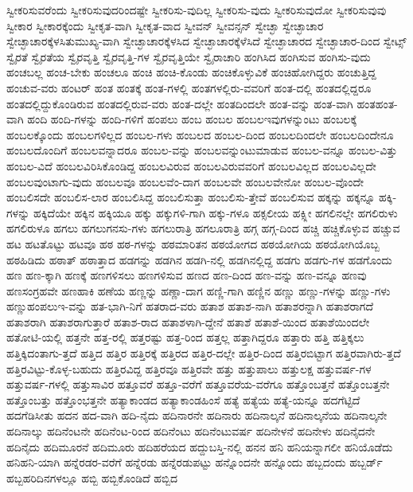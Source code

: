 {ಸ್ವೀಕರಿಸುವರೆಂದು
ಸ್ವೀಕರಿಸುವುದರಿಂದಷ್ಟೇ
ಸ್ವೀಕರಿಸು-ವುದಿಲ್ಲ
ಸ್ವೀಕರಿಸು-ವುದು
ಸ್ವೀಕರಿಸುವುದೋ
ಸ್ವೀಕರಿಸುವುವು
ಸ್ವೀಕಾರ
ಸ್ವೀಕಾರಕ್ಕೆಂದು
ಸ್ವೀಕೃತ-ವಾಗಿ
ಸ್ವೀಕೃತ-ವಾದ
ಸ್ವೀವನ್
ಸ್ವೀವನ್ಸನ್
ಸ್ವೇಚ್ಛಾ
ಸ್ವೇಚ್ಛಾಚಾರ
ಸ್ವೇಚ್ಛಾಚಾರಕ್ಕೆಳಸಿತುಮುಖ್ಯ-ವಾಗಿ
ಸ್ವೇಚ್ಛಾಚಾರಕ್ಕೆಳಸಿದ
ಸ್ವೇಚ್ಛಾಚಾರಕ್ಕೆಳೆಸಿದೆ
ಸ್ವೇಚ್ಛಾಚಾರದ
ಸ್ವೇಚ್ಛಾಚಾರ-ದಿಂದ
ಸ್ವೇಟ್ಸ್
ಸ್ವೈರತೆ
ಸ್ವೈರತೆಯ
ಸ್ವೈರವೃತ್ತಿ
ಸ್ವೈರವೃತ್ತಿ-ಗಳ
ಸ್ವೈರವೃತ್ತಿಯೇ
ಸ್ವೈರಾಚಾರಿ
ಹಂಗಿಸಿದ
ಹಂಗಿಸುವ
ಹಂಗಿಸು-ವುದು
ಹಂಚಬಲ್ಲ
ಹಂಚ-ಬೇಕು
ಹಂಚಲೂ
ಹಂಚಿ
ಹಂಚಿ-ಕೊಂಡು
ಹಂಚಿಕೊಳ್ಳುವಿಕೆ
ಹಂಚಿಹೋಗಿದ್ದರು
ಹಂಚುತ್ತಿದ್ದ
ಹಂಚುವ-ವರು
ಹಂಟರ್
ಹಂತ
ಹಂತಕ್ಕೆ
ಹಂತ-ಗಳಲ್ಲಿ
ಹಂತಗಳಲ್ಲಿರು-ವವರಿಗೆ
ಹಂತ-ದಲ್ಲಿ
ಹಂತದಲ್ಲಿದ್ದರೂ
ಹಂತದಲ್ಲಿದ್ದುಕೊಂಡಿರುವ
ಹಂತದಲ್ಲಿರುವ-ವರು
ಹಂತ-ದಲ್ಲೇ
ಹಂತದಿಂದಲೇ
ಹಂತ-ವನ್ನು
ಹಂತ-ವಾಗಿ
ಹಂತಹಂತ-ವಾಗಿ
ಹಂದಿ
ಹಂದಿ-ಗಳನ್ನು
ಹಂದಿ-ಗಳಿಗೆ
ಹಂಪಲು
ಹಂಬ
ಹಂಬಲ
ಹಂಬಲಇವುಗಳನ್ನುಂಟು
ಹಂಬಲಕ್ಕೆ
ಹಂಬಲಕ್ಕೊಂದು
ಹಂಬಲಗಳಿಲ್ಲದ
ಹಂಬಲ-ಗಳು
ಹಂಬಲದ
ಹಂಬಲ-ದಿಂದ
ಹಂಬಲದಿಂದಲೇ
ಹಂಬಲದಿಂದೇನೂ
ಹಂಬಲದೊಂದಿಗೆ
ಹಂಬಲವನ್ನಾದರೂ
ಹಂಬಲ-ವನ್ನು
ಹಂಬಲವನ್ನುಂಟುಮಾಡುವ
ಹಂಬಲ-ವನ್ನೂ
ಹಂಬಲ-ವಿತ್ತು
ಹಂಬಲ-ವಿದೆ
ಹಂಬಲವಿರಿಸಿಕೊಂಡಿದ್ದ
ಹಂಬಲವಿರುವ
ಹಂಬಲವಿರುವವರಿಗೆ
ಹಂಬಲವಿಲ್ಲದ
ಹಂಬಲವಿಲ್ಲದೇ
ಹಂಬಲವುಂಟಾಗು-ವುದು
ಹಂಬಲವೂ
ಹಂಬಲವೆಂ-ದಾಗ
ಹಂಬಲವೇ
ಹಂಬಲವೇನೋ
ಹಂಬಲ-ವೊಂದೇ
ಹಂಬಲಿಸದೇ
ಹಂಬಲಿಸ-ಲಾರ
ಹಂಬಲಿಸಿದ್ದ
ಹಂಬಲಿಸುತ್ತಾ
ಹಂಬಲಿಸು-ತ್ತೇವೆ
ಹಂಬಲಿಸುವ
ಹಕ್ಕನ್ನು
ಹಕ್ಕನ್ನೂ
ಹಕ್ಕಿ-ಗಳನ್ನು
ಹಕ್ಕಿದೆಯೇ
ಹಕ್ಕಿನ
ಹಕ್ಕಿಯೂ
ಹಕ್ಕು
ಹಕ್ಕುಗಳಿ-ಗಾಗಿ
ಹಕ್ಕು-ಗಳೂ
ಹಕ್ಸಲೀಯ
ಹಕ್ಸ್ಲೀ
ಹಗಲಿನಲ್ಲೇ
ಹಗಲಿರುಳು
ಹಗಲಿರುಳೂ
ಹಗಲು
ಹಗಲುಗನಸು-ಗಳು
ಹಗಲುರಾತ್ರಿ
ಹಗಲೂರಾತ್ರಿ
ಹಗ್ಗ
ಹಗ್ಗ-ದಿಂದ
ಹಚ್ಚಿ
ಹಚ್ಚಿಕೊಳ್ಳುವ
ಹಚ್ಚುವ
ಹಟ
ಹಟತೊಟ್ಟು
ಹಟವೂ
ಹಠ
ಹಠ-ಗಳನ್ನು
ಹಠಮಾರಿತನ
ಹಠಯೋಗದ
ಹಠಯೋಗಿಯ
ಹಠಯೋಗಿಯೊಬ್ಬ
ಹಠಹಿಡಿದು
ಹಠಾತ್
ಹಠಾತ್ತಾದ
ಹಡಗನ್ನು
ಹಡಗಿನ
ಹಡಗಿ-ನಲ್ಲಿ
ಹಡಗಿನಲ್ಲಿದ್ದ
ಹಡಗು
ಹಡಗು-ಗಳ
ಹಡಗೊಂದು
ಹಣ
ಹಣ-ಕ್ಕಾಗಿ
ಹಣಕ್ಕೆ
ಹಣಗಳಿಸಲು
ಹಣಗಳಿಸುವ
ಹಣದ
ಹಣ-ದಿಂದ
ಹಣ-ವನ್ನು
ಹಣ-ವನ್ನೂ
ಹಣವು
ಹಣಸಂಗ್ರಹವೇ
ಹಣಹಾಕಿ
ಹಣೆಯ
ಹಣ್ಣನ್ನು
ಹಣ್ಣಾ-ದಾಗ
ಹಣ್ಣಿ-ಗಾಗಿ
ಹಣ್ಣಿನ
ಹಣ್ಣು
ಹಣ್ಣು-ಗಳನ್ನು
ಹಣ್ಣು-ಗಳು
ಹಣ್ಣುಹಂಪಲುಇ-ವನ್ನು
ಹತ-ಭಾಗಿ-ನಿಗೆ
ಹತರಾದ-ವರು
ಹತಾಶ
ಹತಾಶ-ನಾಗಿ
ಹತಾಶರನ್ನಾಗಿ
ಹತಾಶರಾಗದೆ
ಹತಾಶರಾಗಿ
ಹತಾಶರಾಗುತ್ತಾರೆ
ಹತಾಶ-ರಾದ
ಹತಾಶಳಾಗಿ-ದ್ದೇನೆ
ಹತಾಶೆ
ಹತಾಶೆ-ಯಿಂದ
ಹತಾಶೆಯಿಂದಲೇ
ಹತೋಟಿ-ಯಲ್ಲಿ
ಹತ್ತನೇ
ಹತ್ತ-ರಲ್ಲಿ
ಹತ್ತರಷ್ಟು
ಹತ್ತ-ರಿಂದ
ಹತ್ತಲ್ಲ
ಹತ್ತಾಗಿದ್ದರೂ
ಹತ್ತಾರು
ಹತ್ತಿ
ಹತ್ತಿಕ್ಕಲು
ಹತ್ತಿಕ್ಕಿದಂತಾಗು-ತ್ತದೆ
ಹತ್ತಿದ
ಹತ್ತಿರ
ಹತ್ತಿರಕ್ಕೆ
ಹತ್ತಿರದ
ಹತ್ತಿರ-ದಲ್ಲೇ
ಹತ್ತಿರ-ದಿಂದ
ಹತ್ತಿರಬಿಟ್ಟಾಗ
ಹತ್ತಿರವಾಗಿರು-ತ್ತದೆ
ಹತ್ತಿರವಿಟ್ಟು-ಕೊಳ್ಳ-ಬಹುದು
ಹತ್ತಿರವಿದ್ದ
ಹತ್ತಿರವೂ
ಹತ್ತಿರವೇ
ಹತ್ತು
ಹತ್ತುಪಾಲು
ಹತ್ತುಲಕ್ಷ
ಹತ್ತುವರ್ಷ-ಗಳ
ಹತ್ತುವರ್ಷ-ಗಳಲ್ಲಿ
ಹತ್ತುಸಾವಿರ
ಹತ್ತೂವರೆ
ಹತ್ತೂ-ವರೆಗೆ
ಹತ್ತೂವರೆಯ-ವರೆಗೂ
ಹತ್ತೊಂಬತ್ತನೆ
ಹತ್ತೊಂಬತ್ತನೇ
ಹತ್ತೊಂಬತ್ತು
ಹತ್ತೊಂಭತ್ತನೇ
ಹತ್ಯಾಕಾಂಡದ
ಹತ್ಯಾಕಾಂಡಹಿಂಸೆ
ಹತ್ಯೆ
ಹತ್ಯೆಯ
ಹತ್ಯೆ-ಯನ್ನೂ
ಹದಗೆಟ್ಟಿದೆ
ಹದಗೆಡಿಸೀತು
ಹದನ
ಹದ-ವಾಗಿ
ಹದಿ-ನೈದು
ಹದಿನಾರನೇ
ಹದಿನಾರು
ಹದಿನಾಲ್ಕನೆ
ಹದಿನಾಲ್ಕನೆಯ
ಹದಿನಾಲ್ಕನೇ
ಹದಿನಾಲ್ಕು
ಹದಿನೆಂಟನೇ
ಹದಿನೆಂಟ-ರಿಂದ
ಹದಿನೆಂಟು
ಹದಿನೆಂಟುವರ್ಷ
ಹದಿನೇಳನೆ
ಹದಿನೇಳು
ಹದಿನೈದನೇ
ಹದಿನೈದು
ಹದಿಮೂರನೆ
ಹದಿಮೂರು
ಹದಿಹರೆಯದ
ಹದ್ದುಬಸ್ತಿ-ನಲ್ಲಿ
ಹನನ
ಹನಿ
ಹನಿಯನ್ನಾಗಲೀ
ಹನಿಯೊಡೆದು
ಹನಿಹನಿ-ಯಾಗಿ
ಹನ್ನೆರಡರ-ವರೆಗೆ
ಹನ್ನೆರಡು
ಹನ್ನೆರಡುಪಟ್ಟು
ಹನ್ನೊಂದನೇ
ಹನ್ನೊಂದು
ಹಬ್ಬದಂದು
ಹಬ್ಬರ್ಡ್
ಹಬ್ಬಹರಿದಿನಗಳಲ್ಲೂ
ಹಬ್ಬಿ
ಹಬ್ಬಿಕೊಂಡಿದೆ
ಹಬ್ಬಿದ
}
